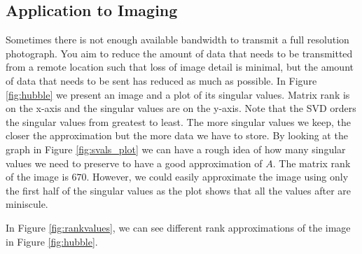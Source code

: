 \subsection*{Application to Imaging}

Sometimes there is not enough available bandwidth to transmit a full resolution photograph.
You aim to reduce the amount of data that needs to be transmitted from a remote location such that loss of image detail is minimal, but the amount of data that needs to be sent has reduced as much as possible.
In Figure \ref{fig:hubble} we present an image and a plot of its singular values.
Matrix rank is on the x-axis and the singular values are on the y-axis.
Note that the SVD orders the singular values from greatest to least.
The more singular values we keep, the closer the approximation but the more data we have to store.
By looking at the graph in Figure \ref{fig:svals_plot} we can have a rough idea of how many singular values we need to preserve to have a good approximation of $A$.
The matrix rank of the image is $670$.
However, we could easily approximate the image using only the first half of the singular values as the plot shows that all the values after are miniscule.



In Figure \ref{fig:rankvalues}, we can see different rank approximations of the image in Figure \ref{fig:hubble}.

